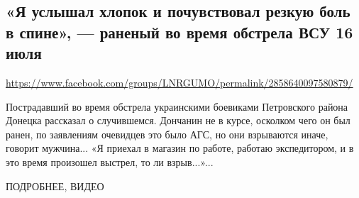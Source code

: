  
 

\subsection{«Я услышал хлопок и почувствовал резкую боль в спине», --- раненый во время обстрела ВСУ 16 июля}
\label{sec:19_07_2020.fb.lnr.10}
\url{https://www.facebook.com/groups/LNRGUMO/permalink/2858640097580879/}
  
Пострадавший во время обстрела украинскими боевиками Петровского района Донецка
рассказал о случившемся.  Дончанин не в курсе, осколком чего он был ранен, по
заявлениям очевидцев это было АГС, но они взрываются иначе, говорит мужчина...
«Я приехал в магазин по работе, работаю экспедитором, и в это время произошел
выстрел, то ли взрыв...»...

ПОДРОБНЕЕ, ВИДЕО 

